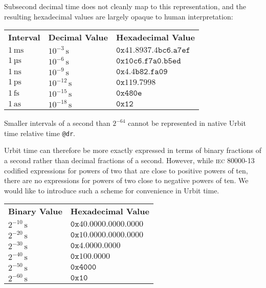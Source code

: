 \documentclass[twoside]{article}
\begin{document}
Subsecond decimal time does not cleanly map to this representation, and the resulting hexadecimal values are largely opaque to human interpretation:

\begin{tabularx}{\textwidth}{lll}
  \textbf{Interval} & \textbf{Decimal Value} & \textbf{Hexadecimal Value} \\
  $1 \,\textrm{ms}$ & $10^{-3} \,\textrm{s}$ & $\mathtt{0x41.8937.4bc6.a7ef}$ \\
  $1 \,\textrm{µs}$ & $10^{-6} \,\textrm{s}$ & $\mathtt{0x10c6.f7a0.b5ed}$ \\
  $1 \,\textrm{ns}$ & $10^{-9} \,\textrm{s}$ & $\mathtt{0x4.4b82.fa09}$ \\
  $1 \,\textrm{ps}$ & $10^{-12} \,\textrm{s}$ & $\mathtt{0x119.7998}$ \\
  $1 \,\textrm{fs}$ & $10^{-15} \,\textrm{s}$ & $\mathtt{0x480e}$ \\
  $1 \,\textrm{as}$ & $10^{-18} \,\textrm{s}$ & $\mathtt{0x12}$ \\
\end{tabularx}

\noindent
Smaller intervals of a second than $2^{-64}$ cannot be represented in native Urbit time relative time \lstinline[style=inlinecode]{@dr}.

Urbit time can therefore be more exactly expressed in terms of binary fractions of a second rather than decimal fractions of a second.  However, while \textsc{iec} 80000-13 codified expressions for powers of two that are close to positive powers of ten, there are no expressions for powers of two close to negative powers of ten.  We would like to introduce such a scheme for convenience in Urbit time.

\begin{tabularx}{\textwidth}{ll}
  \textbf{Binary Value} & \textbf{Hexadecimal Value} \\
  $2^{-10} \,\textrm{s}$ & $\mathtt{0x40.0000.0000.0000}$ \\
  $2^{-20} \,\textrm{s}$ & $\mathtt{0x10.0000.0000.0000}$ \\
  $2^{-30} \,\textrm{s}$ & $\mathtt{0x4.0000.0000}$ \\
  $2^{-40} \,\textrm{s}$ & $\mathtt{0x100.0000}$ \\
  $2^{-50} \,\textrm{s}$ & $\mathtt{0x4000}$ \\
  $2^{-60} \,\textrm{s}$ & $\mathtt{0x10}$ \\
\end{tabularx}
\end{document}
